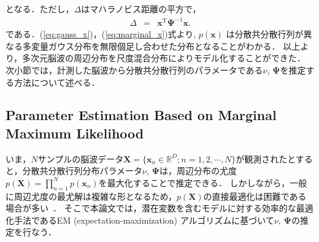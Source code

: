\documentclass[journal]{IEEEtran}
\begin{document}
%
となる．ただし，$\Delta$はマハラノビス距離の平方で，
%
\begin{eqnarray}
	\Delta &=& \mathbf{x}^\mathrm{T}{\bm \Psi}^{-1}\mathbf{x}.
\end{eqnarray}
%
である．(\ref{eq:gauss_x})，(\ref{eq:marginal_x})式より, $p(\mathbf{x})$ は分散共分散行列が異なる多変量ガウス分布を無限個足し合わせた分布となることがわかる．
以上より，多次元脳波の周辺分布を尺度混合分布によりモデル化することができた．
次小節では，計測した脳波から分散共分散行列のパラメータである$\nu$, $\mathbf{\Psi}$を推定する方法について述べる． %

\subsection{Parameter Estimation Based on Marginal Maximum Likelihood}
いま，$N$サンプルの脳波データ$\mathbf{X} = \{\mathbf{x}_n \in \mathbb{R}^{D}; n=1,2,\cdots,N \}$が観測されたとすると，分散共分散行列分布パラメータ$\nu$, $\bm \Psi$は，周辺分布の尤度$p(\mathbf{X}) = \prod_{n=1}^{N} p(\mathbf{x}_n)$を最大化することで推定できる．
しかしながら，一般に周辺尤度の最尤解は複雑な形となるため，$p(\mathbf{X})$の直接最適化は困難である場合が多い~\cite{t2006}．
そこで本論文では，潜在変数を含むモデルに対する効率的な最適化手法であるEM (expectation-maximization) アルゴリズム\cite{Models1998}に基づいて$\nu$, $\bm \Psi$の推定を行なう．
\end{document}
